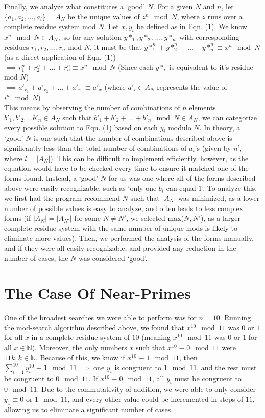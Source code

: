 \documentclass{article}
\begin{document}
\begin{flushleft}
Finally, we analyze what constitutes a `good' $N$. For a given $N$ and $n$, let $\{a_1, a_2, \ldots, a_l\} = A_N$ be the unique values of $z^n \mod N$, where $z$ runs over a complete residue system mod $N$. Let $x, y_i$ be defined as in Eqn. (1). We know $x^n \mod N \in A_N,$ so for any solution $y*_1, y*_2, \ldots, y*_n$ with corresponding residues $r_1, r_2, \ldots, r_n$ mod $N$, it must be that $y*_1^n + y*_2^n + \ldots + y*_n^n \equiv x^n \mod N$ (as a direct application of Eqn. (1)) \\
$\implies r_1^n + r_2^n + \ldots + r_n^n \equiv x^n \mod N$ (Since each $y*_i$ is equivalent to it's residue mod $N$) \\
$\implies a'_{r_1} + a'_{r_2} + \ldots + a'_{r_n} \equiv a'_{x}$ (where $a'_{i} \in A_N$ represents the value of $i^n \mod N$) \\
This means by observing the number of combinations of $n$ elements $b'_1, b'_2, \ldots b'_n \in A_N$ such that $b'_1 + b'_2 + \ldots + b'_n \mod N \in A_N$, we can categorize every possible solution to Eqn. (1) based on each $y_i$ modulo $N$. In theory, a `good' $N$ is one such that the number of combinations described above is significantly less than the total number of combinations of $a_i$'s (given by $n^l$, where $l = |A_N|$). This can be difficult to implement efficiently, however, as the equation would have to be checked every time to ensure it matched one of the forms found. Instead, a `good' $N$ for us was one where all of the forms described above were easily recognizable, such as `only one $b_i$ can equal $1$'. To analyze this, we first had the program recommend $N$ such that $|A_N|$ was minimized, as a lower number of possible values is easy to analyze, and often leads to less complex forms (if $|A_N| = |A_{N'}|$ for some $N \neq N'$, we selected max($N, N'$), as a larger complete residue system with the same number of unique mods is likely to eliminate more values). Then, we performed the analysis of the forms manually, and if they were all easily recognizable, and provided any reduction in the number of cases, the $N$ was considered `good'.

\section{The Case Of Near-Primes}

One of the broadest searches we were able to perform was for $n = 10$. Running the mod-search algorithm described above, we found that $x^{10} \mod 11$ was $0$ or $1$ for all $x$ in a complete residue system of $10$ (meaning $x^{10} \mod 11$ was $0$ or $1$ for all $x \in \mathbb{N}$). Moreover, the only numbers $x$ such that $x^{10} \equiv 0 \mod 11$ were $11k, k \in \mathbb{N}$. Because of this, we know if $x^{10} \equiv 1 \mod 11$, then $\sum^{10}_{i=1}y_i^{10} \equiv 1 \mod 11 \implies$ one $y_i$ is congruent to $1 \mod 11$, and the rest must be congruent to $0 \mod 11$. If $x^10 \equiv 0 \mod 11$, all $y_i$ must be congruent to $0 \mod 11$. Due to the commutativity of addition, we were able to only consider $y_1 \equiv 0$ or $1 \mod 11$, and every other value could be incremented in steps of $11$, allowing us to eliminate a significant number of cases.


\end{flushleft}
\end{document}
